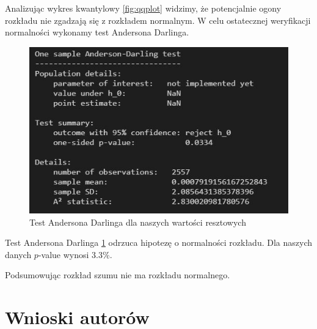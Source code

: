 \documentclass[12pt]{article}
\theoremstyle{exer}
\begin{document}
Analizując wykres kwantylowy \ref{fig:qqplot} widzimy, że potencjalnie ogony rozkładu nie zgadzają się z rozkładem normalnym. W celu ostatecznej weryfikacji normalności wykonamy test Andersona Darlinga. 
\begin{figure}[H]
	\centering
	\includegraphics[width=3\columnwidth/4]{img/ad_test.png}
	\caption{Test Andersona Darlinga dla naszych wartości resztowych}
	\label{Test_AD}
\end{figure}
Test Andersona Darlinga \ref{Test_AD} odrzuca hipotezę o normalności rozkładu. Dla naszych danych $p$-value wynosi $3.3\%$. 

Podsumowując rozkład szumu nie ma rozkładu normalnego.
	\section{Wnioski autorów}
	
	
\end{document}
